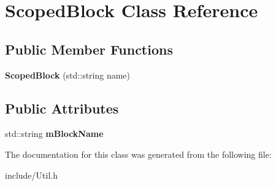 \hypertarget{class_scoped_block}{
\section{ScopedBlock Class Reference}
\label{class_scoped_block}
}
\subsection*{Public Member Functions}
\begin{DoxyCompactItemize}
\item 
\hypertarget{class_scoped_block_a99933a3c1826710fb21e4bb29b222489}{
{\bfseries ScopedBlock} (std::string name)}
\label{class_scoped_block_a99933a3c1826710fb21e4bb29b222489}

\end{DoxyCompactItemize}
\subsection*{Public Attributes}
\begin{DoxyCompactItemize}
\item 
\hypertarget{class_scoped_block_ada4f18d42045aa104ba2f08a683f2a5a}{
std::string {\bfseries mBlockName}}
\label{class_scoped_block_ada4f18d42045aa104ba2f08a683f2a5a}

\end{DoxyCompactItemize}


The documentation for this class was generated from the following file:\begin{DoxyCompactItemize}
\item 
include/Util.h\end{DoxyCompactItemize}
